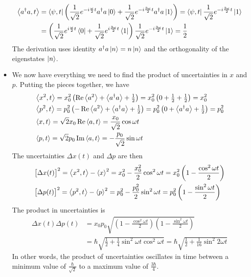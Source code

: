 \documentclass[11pt, a4paper]{article}
\begin{document}
\begin{itemize}
	\begin{align*}
		\ev{a^{\dagger}a, t} &=  \bra{\psi, t}\left(\frac{1}{\sqrt{2}}e^{-i\frac{\omega}{2}t}a^{\dagger}a\ket{0} + \frac{1}{\sqrt{2}}e^{-i\frac{3\omega}{2}t}a^{\dagger}a\ket{1} \right) = \bra{\psi, t} \frac{1}{\sqrt{2}}e^{-i\frac{3\omega}{2}t} \ket{1}\\
		&=\left(\frac{1}{\sqrt{2}}e^{i\frac{\omega}{2}t}\bra{0} + \frac{1}{\sqrt{2}}e^{i\frac{3\omega}{2}t}\bra{1}\right)\frac{1}{\sqrt{2}}e^{-i\frac{3\omega}{2}t} \ket{1}  = \frac{1}{2}
	\end{align*}
	The derivation uses identity $ a^{\dagger}a \ket{n} = n \ket{n} $ and the orthogonality of the eigenstates $ \ket{n} $. 
	
	\item We now have everything we need to find the product of uncertainties in $ x $ and $ p $. Putting the pieces together, we have
	\begin{align*}
		&\ev{x^{2}, t} =  x_{0}^{2}\left(\Re\ev{a^{2}} + \ev{a^{\dagger}a} + \tfrac{1}{2}\right) = x_{0}^{2}\left(0 + \tfrac{1}{2} + \tfrac{1}{2}\right) = x_{0}^{2}\\
		&\ev{p^{2}, t} = p_{0}^{2}\left(-\Re \ev{a^{2}} + \ev{a^{\dagger}a} + \tfrac{1}{2}\right) = p_{0}^{2}\left(0 + \ev{a^{\dagger}a} + \tfrac{1}{2} \right) = p_{0}^{2}\\
		&\ev{x, t} = \sqrt{2}x_{0}\Re\ev{a, t} = \frac{x_{0}}{\sqrt{2}}\cos \omega t \\
		&\ev{p, t} = \sqrt{2}p_{0}\Im\ev{a, t} = - \frac{p_{0}}{\sqrt{2}}\sin \omega t
	\end{align*}
	The uncertainties $ \Delta x(t) $ and $ \Delta p $ are then
	\begin{align*}
		& \big[\Delta x(t)\big]^{2} = \ev{x^{2}, t} - \ev{x}^{2} = x_{0}^{2} - \frac{x_{0}^{2}}{2}\cos^{2} \omega t = x_{0}^{2}\left(1 - \frac{\cos^{2}\omega t}{2}\right)\\
		& \big[\Delta p(t)\big]^{2} = \ev{p^{2}, t} - \ev{p}^{2} = p_{0}^{2} - \frac{p_{0}^{2}}{2}\sin^{2} \omega t = p_{0}^{2}\left(1 - \frac{\sin^{2}\omega t}{2}\right)
	\end{align*}
	The product in uncertainties is
	\begin{align*}
		\Delta x(t) \Delta p(t) &= x_{0}p_{0} \sqrt{\left(1 - \frac{\cos^{2}\omega t}{2}\right)\left(1 - \frac{\sin^{2}\omega t}{2}\right)}\\
		&=\hbar \sqrt{\frac{1}{2} + \frac{1}{4}\sin^{2}\omega t \cos^{2}\omega t  }  = \hbar \sqrt{\frac{1}{2} +  \frac{1}{16}\sin^{2}2\omega t}
	\end{align*}
	In other words, the product of uncertainties oscillates in time between a minimum value of $ \frac{\hbar}{\sqrt{2}} $ to a maximum value of $ \frac{3\hbar}{4} $. 

\end{itemize}
\end{document}
